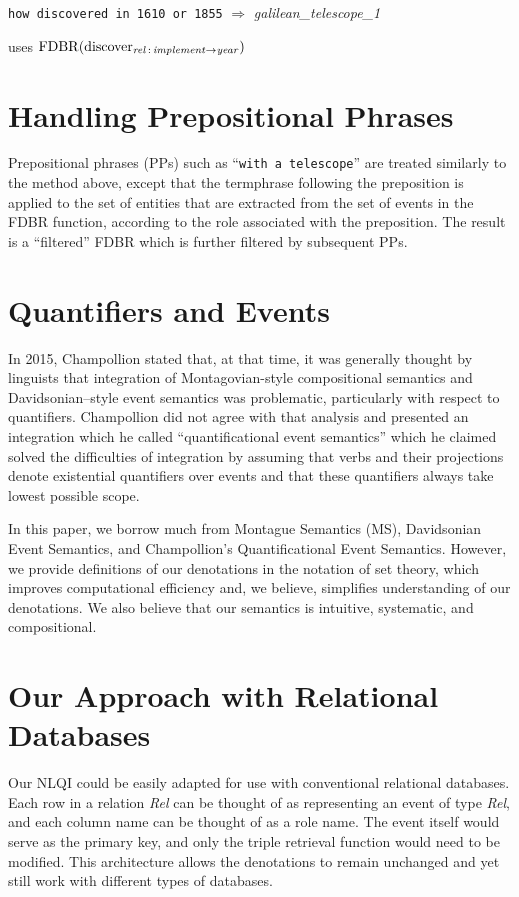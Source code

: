\documentclass[../main.tex]{subfiles}
\begin{document}
\begin{refsection}
{\texttt{how discovered in 1610 or 1855} $\Rightarrow$  \textit{galilean\_telescope\_1}

\hspace{2em} uses $\operatorname{FDBR}({\operatorname{discover}_{\operatorname{\mathit{rel}}\,:\,\operatorname{\mathit{implement}} \rightarrow \operatorname{\mathit{year}}}})$
}

\section{Handling Prepositional Phrases}

Prepositional phrases (PPs) such as ``\texttt{with a telescope}'' are treated
similarly to the method above, except that the termphrase
following the preposition is applied to the set of entities that are extracted from
the set of events in the FDBR function, according to the role associated with
the preposition. The result is a ``filtered'' FDBR which is further filtered by
subsequent PPs.

\section{Quantifiers and Events}
\label{webist2019conf:quant}
In 2015, Champollion \cite{champollion2015interaction} stated that, at that time, it was generally thought by linguists that integration of Montagovian-style compositional semantics and Davidsonian–style event semantics \cite{parsons1990events,davidson1967logical} was problematic, particularly with respect to quantifiers. Champollion did not agree with that analysis and presented an integration which he called ``quantificational event semantics'' which he claimed solved the difficulties of integration by assuming that verbs and their projections denote existential quantifiers over events and that these quantifiers always take lowest possible scope.

In this paper, we borrow much from Montague Semantics (MS), Davidsonian Event Semantics,
and Champollion's Quantificational Event Semantics. However, we provide definitions of our
denotations in the notation of set theory, which improves computational efficiency and, we
believe, simplifies understanding of our denotations. We also believe that our semantics is
intuitive, systematic, and compositional.

\section{Our Approach with Relational Databases}

Our NLQI could be easily adapted for use with conventional relational databases.
Each row in a relation \textit{Rel} can be thought of as representing an event of type \textit{Rel}, and each column name can be thought of as a role name.  The event itself would serve as the primary key, and only the triple retrieval function would need to be modified.  This architecture allows the denotations to remain unchanged and yet still work with different types of databases.


\end{refsection}
\end{document}
